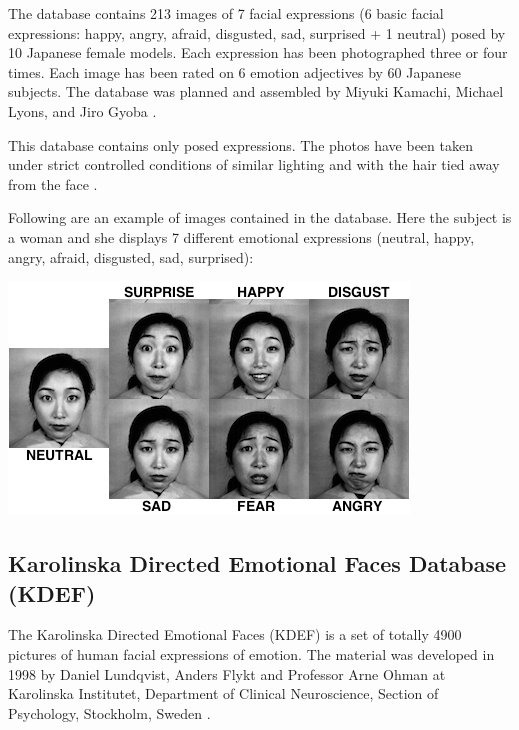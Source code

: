 \vspace{\baselineskip}
\noindent The database contains 213 images of 7 facial expressions (6 basic facial expressions: happy, angry, afraid, disgusted, sad, surprised + 1 neutral) posed by 10 Japanese female models. Each expression has been photographed three or four times. Each image has been rated on 6 emotion adjectives by 60 Japanese subjects. The database was planned and assembled by Miyuki Kamachi, Michael Lyons, and Jiro Gyoba \cite{JAFFE}.
\newline

\noindent This database contains only posed expressions. The photos have been taken under strict controlled conditions of similar lighting and with the hair tied away from the face \cite{BET12}. 
\newline

\noindent Following are an example of images contained in the database. Here the subject is a woman and she displays 7 different emotional expressions (neutral, happy, angry, afraid, disgusted, sad, surprised): 
\newline

\vspace{\baselineskip}
\begin{center}
\noindent \includegraphics[scale=0.8]{figures/jaffe_7facialexpressions} 
\newline
\end{center} 

\subsection{Karolinska Directed Emotional Faces Database (KDEF)}

\vspace{\baselineskip}
\noindent The Karolinska Directed Emotional Faces (KDEF) is a set of totally 4900 pictures of human facial expressions of emotion. The material was developed in 1998 by Daniel Lundqvist, Anders Flykt and Professor Arne Ohman at Karolinska Institutet, Department of Clinical Neuroscience, Section of Psychology, Stockholm, Sweden \cite{KDEF}.
\newline

